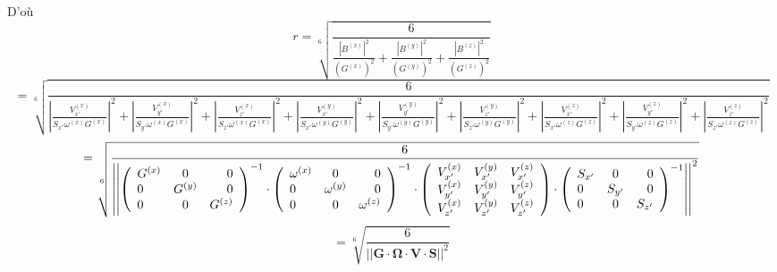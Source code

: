 \documentclass[a4paper,11pt]{article}
\begin{document}
D'où
\[
r = \sqrt[6]{
  \frac{6}{
    \frac{\left|B^{(x)}\right|^2}{\left(G^{(x)}\right)^2} + 
    \frac{\left|B^{(y)}\right|^2}{\left(G^{(y)}\right)^2} + 
    \frac{\left|B^{(z)}\right|^2}{\left(G^{(z)}\right)^2}
  }
} 
\]
\begingroup
\tiny
\[  
= \sqrt[6]{
  \frac{6}{
    \left| \frac{V^{(x)}_{x'}}{S_{x'}\omega^{(x)} G^{(x)}}\right|^2 + 
    \left| \frac{V^{(x)}_{y'}}{S_{y'}\omega^{(x)} G^{(x)}}\right|^2 + 
    \left| \frac{V^{(x)}_{z'}}{S_{z'}\omega^{(x)} G^{(x)}}\right|^2
    +
    \left| \frac{V^{(y)}_{x'}}{S_{x'}\omega^{(y)} G^{(y)}}\right|^2 + 
    \left| \frac{V^{(y)}_{y'}}{S_{y'}\omega^{(y)} G^{(y)}}\right|^2 + 
    \left| \frac{V^{(y)}_{z'}}{S_{z'}\omega^{(y)} G^{(y)}}\right|^2
    +
    \left| \frac{V^{(z)}_{x'}}{S_{x'}\omega^{(z)} G^{(z)}}\right|^2 + 
    \left| \frac{V^{(z)}_{y'}}{S_{y'}\omega^{(z)} G^{(z)}}\right|^2 + 
    \left| \frac{V^{(z)}_{z'}}{S_{z'}\omega^{(z)} G^{(z)}}\right|^2
  }
}
\]
\[
= \sqrt[6]{
  \frac{6}{
    \left|\left|
        \left(
          \begin{array}{l c r}
            G^{(x)} & 0 & 0 \\
            0 & G^{(y)}& 0 \\
            0 & 0 & G^{(z)}
          \end{array} 
        \right)^{-1}
        \cdot
        \left(
          \begin{array}{l c r}
            \omega^{(x)} & 0 & 0 \\
            0 & \omega^{(y)}& 0 \\
            0 & 0 & \omega^{(z)}
          \end{array} 
        \right)^{-1}
        \cdot
        \left(
          \begin{array}{l c r}
            V^{(x)}_{x'} & V^{(y)}_{x'} & V^{(z)}_{x'} \\
            V^{(x)}_{y'} & V^{(y)}_{y'} & V^{(z)}_{y'} \\
            V^{(x)}_{z'} & V^{(y)}_{z'} & V^{(z)}_{z'} 
          \end{array} 
        \right)
        \cdot
        \left(
          \begin{array}{l c r}
            S_{x'} & 0 & 0 \\
            0 & S_{y'} & 0 \\
            0 & 0 & S_{z'}
          \end{array}
        \right)^{-1}
      \right|\right|^2
  }
}
\]
\endgroup
\[
= \sqrt[6]{
  \frac{6}{
    \left|\left|
        \mathbf{G}
        \cdot
        \mathbf{\Omega}
        \cdot
        \mathbf{V}
        \cdot
        \mathbf{S}
      \right|\right|^2
  }
} 
\]
\end{document}
